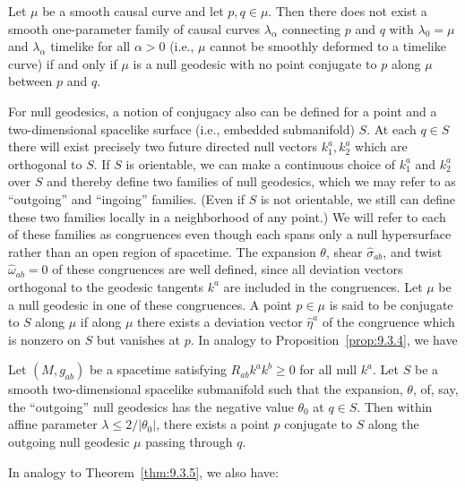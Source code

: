 \begin{theorem}\label{thm:9.3.8}
Let \(\mu\) be a smooth causal curve and let \(p,q\in\mu\). Then there does not
exist a smooth one-parameter family of causal curves \(\lambda_\alpha\) connecting
\(p\) and \(q\) with \(\lambda_0=\mu\) and \(\lambda_\alpha\) timelike for all
\(\alpha>0\) (i.e., \(\mu\) cannot be smoothly deformed to a timelike curve) if
and only if \(\mu\) is a null geodesic with no point conjugate to \(p\) along
\(\mu\) between \(p\) and \(q\).
\end{theorem}

For null geodesics, a notion of conjugacy also can be defined for a point and a
two-dimensional spacelike surface (i.e., embedded submanifold) \(S\). At each
\(q\in S\) there will exist precisely two future directed null vectors \(k_1^a,k_2^a\)
which are orthogonal to \(S\). If \(S\) is orientable, we can make a continuous choice
of \(k_1^a\) and \(k_2^a\) over \(S\) and thereby define two families of null geodesics,
which we may refer to as ``outgoing'' and ``ingoing'' families. (Even if \(S\) is not
orientable, we still can define these two families locally in a neighborhood of any
point.) We will refer to each of these families as congruences even though each spans
only a null hypersurface rather than an open region of spacetime. The expansion
\(\theta\), shear \(\widehat\sigma_{ab}\), and twist \(\widehat\omega_{ab}=0\) of these
congruences are well defined, since all deviation vectors orthogonal to the geodesic
tangents \(k^a\) are included in the congruences. Let \(\mu\) be a null geodesic in one
of these congruences. A point \(p\in\mu\) is said to be conjugate to \(S\) along
\(\mu\) if along \(\mu\) there exists a deviation vector \(\widehat\eta^a\) of the
congruence which is nonzero on \(S\) but vanishes at \(p\). In analogy to
Proposition~\ref{prop:9.3.4}, we have

\begin{proposition}\label{prop:9.3.9}
Let \((M,g_{ab})\) be a spacetime satisfying \(R_{ab}k^ak^b\geq0\) for all null
\(k^a\). Let \(S\) be a smooth two-dimensional spacelike submanifold such that
the expansion, \(\theta\), of, say, the ``outgoing'' null geodesics has the negative
value \(\theta_0\) at \(q\in S\). Then within affine parameter
\(\lambda\leq2/\lvert\theta_0\rvert\), there exists a point \(p\) conjugate to \(S\)
along the outgoing null geodesic \(\mu\) passing through \(q\).
\end{proposition}

In analogy to Theorem~\ref{thm:9.3.5}, we also have:

